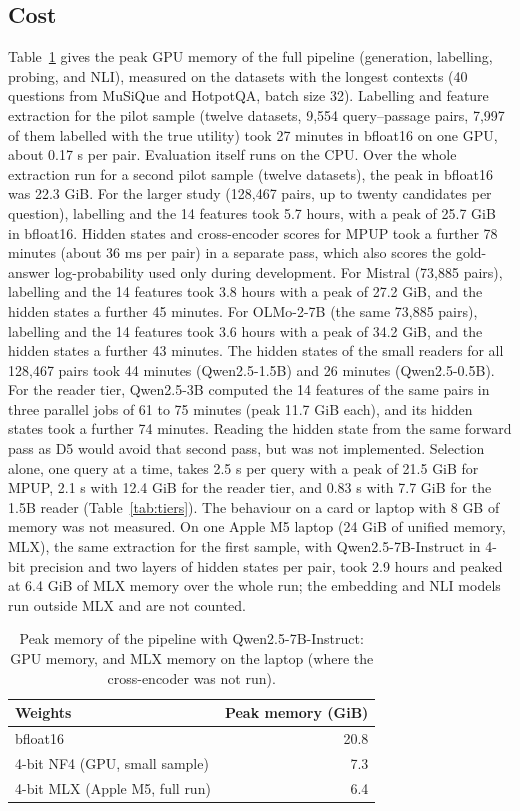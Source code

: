 \documentclass[preprint,12pt,authoryear]{elsarticle}
\begin{document}
\subsection{Cost}\label{sec:cost}
Table~\ref{tab:memory} gives the peak GPU memory of the full pipeline (generation, labelling, probing, and NLI), measured on the datasets with the longest contexts (40 questions from MuSiQue and HotpotQA, batch size 32). Labelling and feature extraction for the pilot sample (twelve datasets, 9,554 query--passage pairs, 7,997 of them labelled with the true utility) took 27 minutes in bfloat16 on one GPU, about 0.17 s per pair. Evaluation itself runs on the CPU. Over the whole extraction run for a second pilot sample (twelve datasets), the peak in bfloat16 was 22.3 GiB. For the larger study (128,467 pairs, up to twenty candidates per question), labelling and the 14 features took 5.7 hours, with a peak of 25.7 GiB in bfloat16. Hidden states and cross-encoder scores for MPUP took a further 78 minutes (about 36 ms per pair) in a separate pass, which also scores the gold-answer log-probability used only during development. For Mistral (73,885 pairs), labelling and the 14 features took 3.8 hours with a peak of 27.2 GiB, and the hidden states a further 45 minutes. For OLMo-2-7B (the same 73,885 pairs), labelling and the 14 features took 3.6 hours with a peak of 34.2 GiB, and the hidden states a further 43 minutes. The hidden states of the small readers for all 128,467 pairs took 44 minutes (Qwen2.5-1.5B) and 26 minutes (Qwen2.5-0.5B). For the reader tier, Qwen2.5-3B computed the 14 features of the same pairs in three parallel jobs of 61 to 75 minutes (peak 11.7 GiB each), and its hidden states took a further 74 minutes. Reading the hidden state from the same forward pass as D5 would avoid that second pass, but was not implemented. Selection alone, one query at a time, takes 2.5 s per query with a peak of 21.5 GiB for MPUP, 2.1 s with 12.4 GiB for the reader tier, and 0.83 s with 7.7 GiB for the 1.5B reader (Table~\ref{tab:tiers}). The behaviour on a card or laptop with 8 GB of memory was not measured. On one Apple M5 laptop (24 GiB of unified memory, MLX), the same extraction for the first sample, with Qwen2.5-7B-Instruct in 4-bit precision and two layers of hidden states per pair, took 2.9 hours and peaked at 6.4 GiB of MLX memory over the whole run; the embedding and NLI models run outside MLX and are not counted.

\begin{table}[htbp]
    \centering
    \caption{Peak memory of the pipeline with Qwen2.5-7B-Instruct: GPU memory, and MLX memory on the laptop (where the cross-encoder was not run).}
    \label{tab:memory}
    \footnotesize
    \begin{tabular}{lr}
        \toprule
        \textbf{Weights} & \textbf{Peak memory (GiB)} \\
        \midrule
        bfloat16 & 20.8 \\
        4-bit NF4 (GPU, small sample) & 7.3 \\
        4-bit MLX (Apple M5, full run) & 6.4 \\
        \bottomrule
    \end{tabular}
\end{table}
\end{document}

